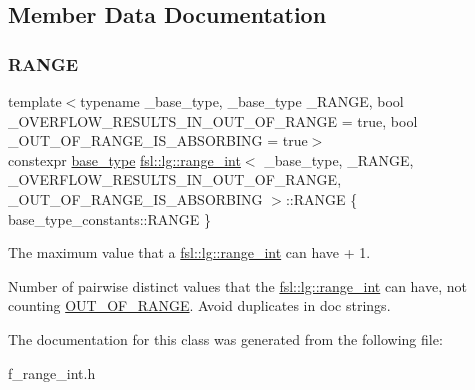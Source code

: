 \subsection{Member Data Documentation}
\mbox{\label{classfsl_1_1lg_1_1range__int_a438be32af68025525703578ac9fdcd09}} 
\subsubsection{\texorpdfstring{RANGE}{RANGE}}
{\footnotesize\ttfamily template$<$typename \+\_\+base\+\_\+type, \+\_\+base\+\_\+type \+\_\+\+R\+A\+N\+GE, bool \+\_\+\+O\+V\+E\+R\+F\+L\+O\+W\+\_\+\+R\+E\+S\+U\+L\+T\+S\+\_\+\+I\+N\+\_\+\+O\+U\+T\+\_\+\+O\+F\+\_\+\+R\+A\+N\+GE = true, bool \+\_\+\+O\+U\+T\+\_\+\+O\+F\+\_\+\+R\+A\+N\+G\+E\+\_\+\+I\+S\+\_\+\+A\+B\+S\+O\+R\+B\+I\+NG = true$>$ \\
constexpr \mbox{\hyperlink{classfsl_1_1lg_1_1range__int_a4ce67cd216fd303b7bae83a7cbcab3bb}{base\+\_\+type}} \mbox{\hyperlink{classfsl_1_1lg_1_1range__int}{fsl\+::lg\+::range\+\_\+int}}$<$ \+\_\+base\+\_\+type, \+\_\+\+R\+A\+N\+GE, \+\_\+\+O\+V\+E\+R\+F\+L\+O\+W\+\_\+\+R\+E\+S\+U\+L\+T\+S\+\_\+\+I\+N\+\_\+\+O\+U\+T\+\_\+\+O\+F\+\_\+\+R\+A\+N\+GE, \+\_\+\+O\+U\+T\+\_\+\+O\+F\+\_\+\+R\+A\+N\+G\+E\+\_\+\+I\+S\+\_\+\+A\+B\+S\+O\+R\+B\+I\+NG $>$\+::R\+A\+N\+GE \{ base\+\_\+type\+\_\+constants\+::\+R\+A\+N\+GE \}\hspace{0.3cm}{\ttfamily [static]}}



The maximum value that a \mbox{\hyperlink{classfsl_1_1lg_1_1range__int}{fsl\+::lg\+::range\+\_\+int}} can have + 1. 

Number of pairwise distinct values that the \mbox{\hyperlink{classfsl_1_1lg_1_1range__int}{fsl\+::lg\+::range\+\_\+int}} can have, not counting \mbox{\hyperlink{classfsl_1_1lg_1_1range__int_acbcdf600daa56d701bdf215ccfb43ce7}{O\+U\+T\+\_\+\+O\+F\+\_\+\+R\+A\+N\+GE}}. Avoid duplicates in doc strings. 

The documentation for this class was generated from the following file\+:\begin{DoxyCompactItemize}
\item 
f\+\_\+range\+\_\+int.\+h\end{DoxyCompactItemize}
